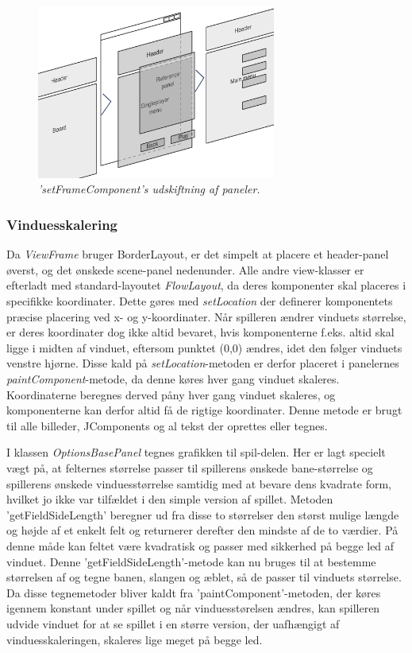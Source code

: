 \begin{figure}[h]
	\centering
   	\includegraphics[width=0.7\textwidth]{View.png}
	\caption{\textit{'setFrameComponent's udskiftning af paneler.}}
\end{figure}


\subsubsection{Vinduesskalering}
Da \textit{ViewFrame} bruger BorderLayout, er det simpelt at placere et header-panel øverst, og det ønskede scene-panel nedenunder. Alle andre view-klasser er efterladt med standard-layoutet \textit{FlowLayout}, da deres komponenter skal placeres i specifikke koordinater. Dette gøres med \textit{setLocation} der definerer komponentets præcise placering ved x- og y-koordinater. Når spilleren ændrer vinduets størrelse, er deres koordinater dog ikke altid bevaret, hvis komponenterne f.eks. altid skal ligge i midten af vinduet, eftersom punktet (0,0) ændres, idet den følger vinduets venstre hjørne. Disse kald på \textit{setLocation}-metoden er derfor placeret i panelernes \textit{paintComponent}-metode, da denne køres hver gang vinduet skaleres. Koordinaterne beregnes derved påny hver gang vinduet skaleres, og komponenterne kan derfor altid få de rigtige koordinater. Denne metode er brugt til alle billeder, JComponents og al tekst der oprettes eller tegnes.
\newline

I klassen \textit{OptionsBasePanel} tegnes grafikken til spil-delen. Her er lagt specielt vægt på, at felternes størrelse passer til spillerens ønskede bane-størrelse og spillerens ønskede vinduesstørrelse samtidig med at bevare dens kvadrate form, hvilket jo ikke var tilfældet i den simple version af spillet. Metoden 'getFieldSideLength' beregner ud fra disse to størrelser den størst mulige længde og højde af et enkelt felt og returnerer derefter den mindste af de to værdier. På denne måde kan feltet være kvadratisk og passer med sikkerhed på begge led af vinduet. Denne 'getFieldSideLength'-metode kan nu bruges til at bestemme størrelsen af og tegne banen, slangen og æblet, så de passer til vinduets størrelse. Da disse tegnemetoder bliver kaldt fra 'paintComponent'-metoden, der køres igennem konstant under spillet og når vinduesstørelsen ændres, kan spilleren udvide vinduet for at se spillet i en større version, der uafhængigt af vinduesskaleringen, skaleres lige meget på begge led.

